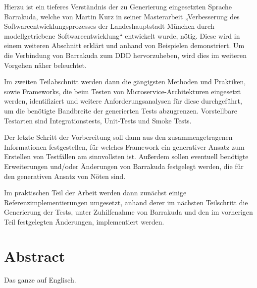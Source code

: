 \documentclass[12pt,a4paper,bibliography=totocnumbered,listof=totocnumbered]{scrartcl}
\begin{document}
Hierzu ist ein tieferes Verständnis der zu Generierung eingesetzten Sprache Barrakuda, welche von Martin Kurz in seiner Masterarbeit „Verbesserung des Softwareentwicklungsprozesses der Landeshauptstadt München durch modellgetriebene Softwareentwicklung“ entwickelt wurde, nötig. Diese wird in einem weiteren Abschnitt erklärt und anhand von Beispielen demonstriert. Um die Verbindung von Barrakuda zum DDD hervorzuheben, wird dies im weiteren Vorgehen näher beleuchtet.

Im zweiten Teilabschnitt werden dann die gängigsten Methoden und Praktiken, sowie Frameworks, die beim Testen von Microservice-Architekturen eingesetzt werden, identifiziert und weitere Anforderungsanalysen für diese durchgeführt, um die benötigte Bandbreite der generierten Tests abzugrenzen. Vorstellbare Testarten sind Integrationstests, Unit-Tests und Smoke Tests.

Der letzte Schritt der Vorbereitung soll dann aus den zusammengetragenen Informationen festgestellen, für welches Framework ein generativer Ansatz zum Erstellen von Testfällen am sinnvollsten ist. Außerdem sollen eventuell benötigte Erweiterungen und/oder Änderungen von Barrakuda festgelegt werden, die für den generativen Ansatz von Nöten sind.

Im praktischen Teil der Arbeit werden dann zunächst einige Referenzimplementierungen umgesetzt, anhand derer im nächsten Teilschritt die Generierung der Tests, unter Zuhilfenahme von Barrakuda und den im vorherigen Teil festgelegten Änderungen, implementiert werden.

\vspace{-1,2em}
\section*{Abstract}
Das ganze auf Englisch.
\pagebreak

\renewcommand{\cfttabpresnum}{Tab. }
\renewcommand{\cftfigpresnum}{Abb. }
\settowidth{\cfttabnumwidth}{Abb. 10\quad}
\settowidth{\cftfignumwidth}{Abb. 10\quad}
\end{document}
